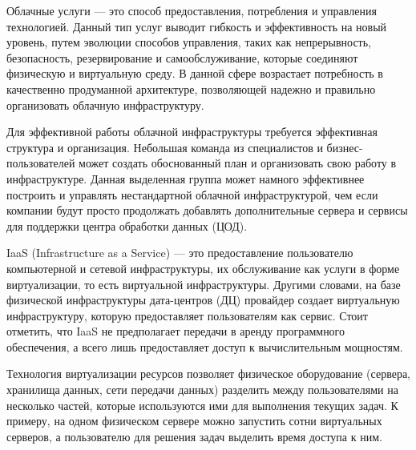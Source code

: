 
Облачные услуги --- это способ предоставления, потребления и управления технологией.
Данный тип услуг выводит гибкость и эффективность на новый уровень, путем эволюции способов управления, таких как непрерывность, безопасность, резервирование и самообслуживание, которые соединяют физическую и виртуальную среду.
В данной сфере возрастает потребность в качественно продуманной архитектуре, позволяющей надежно и правильно организовать облачную инфраструктуру.

Для эффективной работы облачной инфраструктуры требуется эффективная структура и организация.
Небольшая команда из специалистов и бизнес-пользователей может создать обоснованный план и организовать свою работу в инфраструктуре.
Данная выделенная группа может намного эффективнее построить и управлять нестандартной облачной инфраструктурой, чем если компании будут просто продолжать добавлять дополнительные сервера и сервисы для поддержки центра обработки данных (ЦОД).

IaaS (Infrastructure as a Service) --- это предоставление пользователю компьютерной и сетевой инфраструктуры, их обслуживание как услуги в форме виртуализации, то есть виртуальной инфраструктуры.
Другими словами, на базе физической инфраструктуры дата-центров (ДЦ) провайдер создает виртуальную инфраструктуру, которую предоставляет пользователям как сервис.
Стоит отметить, что IaaS не предполагает передачи в аренду программного обеспечения, а всего лишь предоставляет доступ к вычислительным мощностям.

Технология виртуализации ресурсов позволяет физическое оборудование (сервера, хранилища данных, сети передачи данных) разделить между пользователями на несколько частей, которые используются ими для выполнения текущих задач.
К примеру, на одном физическом сервере можно запустить сотни виртуальных серверов, а пользователю для решения задач выделить время доступа к ним.

\clearpage